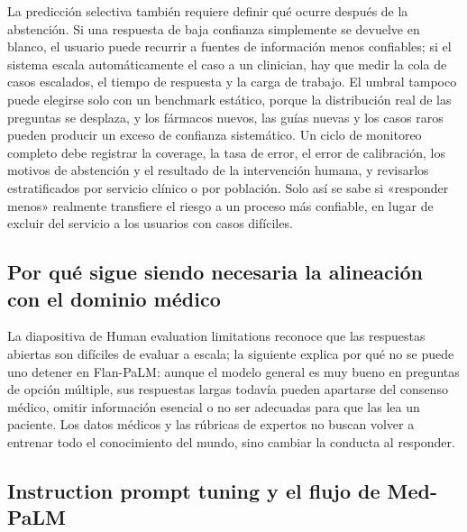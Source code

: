 La predicción selectiva también requiere definir qué ocurre después de la abstención. Si una respuesta de baja confianza simplemente se devuelve en blanco, el usuario puede recurrir a fuentes de información menos confiables; si el sistema escala automáticamente el caso a un clinician, hay que medir la cola de casos escalados, el tiempo de respuesta y la carga de trabajo. El umbral tampoco puede elegirse solo con un benchmark estático, porque la distribución real de las preguntas se desplaza, y los fármacos nuevos, las guías nuevas y los casos raros pueden producir un exceso de confianza sistemático. Un ciclo de monitoreo completo debe registrar la coverage, la tasa de error, el error de calibración, los motivos de abstención y el resultado de la intervención humana, y revisarlos estratificados por servicio clínico o por población. Solo así se sabe si «responder menos» realmente transfiere el riesgo a un proceso más confiable, en lugar de excluir del servicio a los usuarios con casos difíciles.

\subsection{Por qué sigue siendo necesaria la alineación con el dominio médico}

La diapositiva de Human evaluation limitations reconoce que las respuestas abiertas son difíciles de evaluar a escala; la siguiente explica por qué no se puede uno detener en Flan-PaLM: aunque el modelo general es muy bueno en preguntas de opción múltiple, sus respuestas largas todavía pueden apartarse del consenso médico, omitir información esencial o no ser adecuadas para que las lea un paciente. Los datos médicos y las rúbricas de expertos no buscan volver a entrenar todo el conocimiento del mundo, sino cambiar la conducta al responder.



\subsection{Instruction prompt tuning y el flujo de Med-PaLM}

